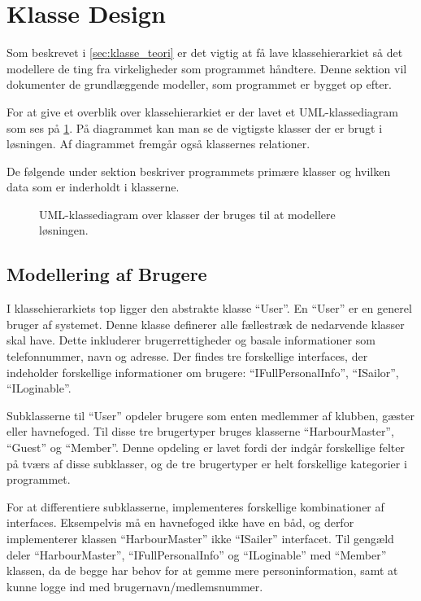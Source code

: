 \section{Klasse Design}
\label{sec:klasse_design}
Som beskrevet i \cref{sec:klasse_teori} er det vigtig at få lave klassehierarkiet så det modellere de ting fra virkeligheder som programmet håndtere. Denne sektion vil dokumenter de grundlæggende modeller, som programmet er bygget op efter. 

For at give et overblik over klassehierarkiet er der lavet et UML-klassediagram som ses på \cref{fig:UML}. På diagrammet kan man se de vigtigste klasser der er brugt i løsningen. Af diagrammet fremgår også klassernes relationer.

De følgende under sektion beskriver programmets primære klasser og hvilken data som er inderholdt i klasserne.


\begin{figure}
  \centering
  \vspace*{-4.5cm}
 	\caption{UML-klassediagram over klasser der bruges til at modellere løsningen.} \label{fig:UML}  
 \end{figure}

\subsection{Modellering af Brugere}
\label{sub:brugere_af_programmet}

I klassehierarkiets top ligger den abstrakte klasse \enquote{User}. En \enquote{User} er en generel bruger af systemet. Denne klasse definerer alle fællestræk de nedarvende klasser skal have. Dette inkluderer brugerrettigheder og basale informationer som telefonnummer, navn og adresse. Der findes tre forskellige interfaces, der indeholder forskellige informationer om brugere: \enquote{IFullPersonalInfo}, \enquote{ISailor}, \enquote{ILoginable}.

Subklasserne til \enquote{User} opdeler brugere som enten medlemmer af klubben, gæster eller havnefoged. Til disse tre brugertyper bruges klasserne \enquote{HarbourMaster}, \enquote{Guest} og \enquote{Member}. Denne opdeling er lavet fordi der indgår forskellige felter på tværs af disse subklasser, og de tre brugertyper er helt forskellige kategorier i programmet. 

For at differentiere subklasserne, implementeres forskellige kombinationer af interfaces. Eksempelvis må en havnefoged ikke have en båd, og derfor implementerer klassen \enquote{HarbourMaster} ikke \enquote{ISailer} interfacet. Til gengæld deler \enquote{HarbourMaster}, \enquote{IFullPersonalInfo} og \enquote{ILoginable} med \enquote{Member} klassen, da de begge har behov for at gemme mere personinformation, samt at kunne logge ind med brugernavn/medlemsnummer.
 
